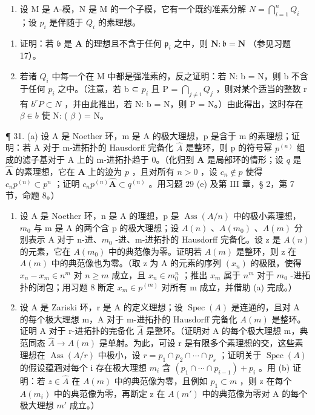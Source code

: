 \begin{enumerate}
\def\labelenumi{\arabic{enumi}.}
\setcounter{enumi}{29}
\tightlist
\item
  设 M 是 A-模，N 是 M 的一个子模，它有一个既约准素分解 \(N = \bigcap_{i=1}^{n} Q_{i}\) ；设 \(p_{i}\) 是伴随于 \(Q_{i}\) 的素理想。
\end{enumerate}

\begin{enumerate}
\def\labelenumi{(\alph{enumi})}
\item
  证明：若 \(\mathfrak{b}\) 是 \(\mathbf{A}\) 的理想且不含于任何 \(\mathfrak{p}_i\) 之中，则 \(\mathbf{N}:\mathfrak{b} = \mathbf{N}\) （参见习题 17）。
\item
  若诸 \(Q_{i}\) 中每一个在 M 中都是强准素的，反之证明：若 N: b = N，则 b 不含于任何 \(p_{i}\) 之中。（注意，若 b ⊂ \(p_{i}\) 且 P = \(\bigcap_{j \neq i} Q_{j}\) ，则对某个适当的整数 r 有 \(b^rP \subset N\) ，并由此推出，若 N: b = N，则 P = N。）由此得出，这时存在 \(\beta \in b\) 使 N: ( \(\beta\) ) = N。
\end{enumerate}

¶ 31. (a) 设 A 是 Noether 环，m 是 A 的极大理想，p 是含于 m 的素理想；证明：若 A 对于 m-进拓扑的 Hausdorff 完备化 \(\hat{A}\) 是整环，则 p 的符号幂 \(p^{(n)}\) 组成的滤子基对于 A 上的 m-进拓扑趋于 0。（化归到 \(\mathbf{A}\) 是局部环的情形；设 \(q\) 是 \(\hat{\mathbf{A}}\) 的素理想，它在 \(\mathbf{A}\) 上的迹为 \(p\) ，且对所有 \(n > 0\) ，设 \(c_{n} \notin p\) 使得 \(c_{n} p^{(n)} \subset p^{n}\) ；证明 \(c_{n} p^{(n)} \hat{\mathbf{A}} \subset q^{(n)}\) 。用习题 29 (e) 及第 III 章，§ 2，第 7 节，命题 8。）

\begin{enumerate}
\def\labelenumi{(\alph{enumi})}
\setcounter{enumi}{1}
\item
  设 A 是 Noether 环，n 是 A 的理想，p 是 \(\operatorname{Ass}(A/n)\) 中的极小素理想，\(m_{0}\) 与 m 是 A 的两个含 p 的极大理想；设 \(A(n)\) 、\(A(m_{0})\) 、\(A(m)\) 分别表示 A 对于 n-进、\(m_{0}\) -进、m-进拓扑的 Hausdorff 完备化。设 z 是 \(A(n)\) 的元素，它在 \(A(m_{0})\) 中的典范像为零。证明若 \(A(m)\) 是整环，则 z 在 \(A(m)\) 中的典范像也为零。（取 z 为 A 的元素的序列 \((x_{n})\) 的极限，使得 \(x_{n}-x_{m}\in n^{m}\) 对 \(n\geqslant m\) 成立，且 \(x_{n}\in m_{0}^{n}\) ；推出 \(x_{m}\) 属于 \(n^{m}\) 对于 \(m_{0}\) -进拓扑的闭包；用习题 8 断定 \(x_{m}\in p^{(m)}\) 对所有 m 成立，并借助 (a) 完成。）
\item
  设 A 是 Zariski 环，r 是 A 的定义理想；设 \(\operatorname{Spec}(A)\) 是连通的，且对 A 的每个极大理想 m，A 对于 m-进拓扑的 Hausdorff 完备化 \(A(m)\) 是整环。证明 A 对于 r-进拓扑的完备化 \(\hat{A}\) 是整环。（证明对 A 的每个极大理想 m，典范同态 \(\hat{A} \to A(m)\) 是单射。为此，可设 r 是有限多个素理想的交，这些素理想在 \(\operatorname{Ass}(A/r)\) 中极小，设 \(r = p_{1} \cap p_{2} \cap \cdots \cap p_{s}\) ；证明关于 \(\operatorname{Spec}(A)\) 的假设蕴涵对每个 i 存在极大理想 \(m_{i}\) 含 \((p_{1} \cap \cdots \cap p_{i-1}) + p_{i}\) 。用 (b) 证明：若 \(z \in \hat{A}\) 在 \(A(m)\) 中的典范像为零，且例如 \(p_{1} \subset m\) ，则 z 在每个 \(A(m_{i})\) 中的典范像为零，再断定 z 在 \(A(m')\) 中的典范像为零对 A 的每个极大理想 \(m'\) 成立。）
\end{enumerate}

